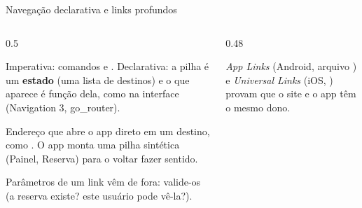 \begin{frame}{Navegação declarativa e links profundos}
  \begin{columns}[T]
    \begin{column}{0.5\textwidth}
      \begin{definicao}
        Imperativa: comandos  e . Declarativa: a pilha é um \textbf{estado} (uma lista de destinos) e o que aparece é função dela, como na interface (Navigation 3, go\_router).
      \end{definicao}
      \begin{definicao}
        Endereço que abre o app direto em um destino, como . O app monta uma pilha sintética (Painel, Reserva) para o voltar fazer sentido.
      \end{definicao}
      \begin{atencao}
        Parâmetros de um link vêm de fora: valide-os (a reserva existe? este usuário pode vê-la?).
      \end{atencao}
    \end{column}
    \begin{column}{0.48\textwidth}
      \centering
      \raggedright
      \begin{pordentro}
        \emph{App Links} (Android, arquivo ) e \emph{Universal Links} (iOS, ) provam que o site e o app têm o mesmo dono.
      \end{pordentro}
    \end{column}
  \end{columns}
\end{frame}

